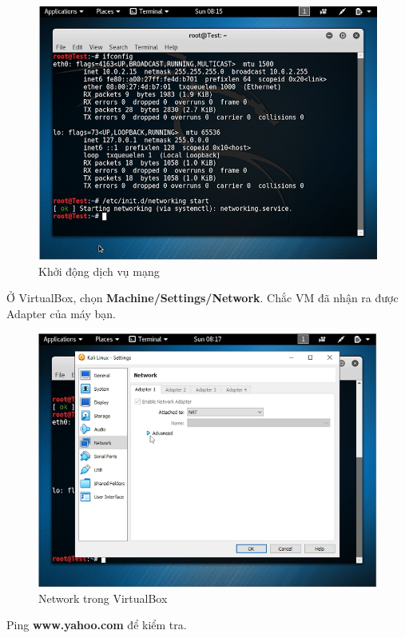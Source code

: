 \begin{figure}[!htb]
    \centering
    \includegraphics[width=0.85\linewidth]{figure//chapter5//lab5_1/networking_service.png}
    \caption{Khởi động dịch vụ mạng}
    \label{fig:enter-label}
\end{figure}

 Ở VirtualBox, chọn \textbf{Machine/Settings/Network}. Chắc VM đã nhận ra được Adapter của máy bạn.

\begin{figure}[!htb]
    \centering
    \includegraphics[width=0.85\linewidth]{figure//chapter5//lab5_1/vm_network.png}
    \caption{Network trong VirtualBox}
    \label{fig:enter-label}
\end{figure}

\newpage

 Ping \textbf{www.yahoo.com} để kiểm tra.

